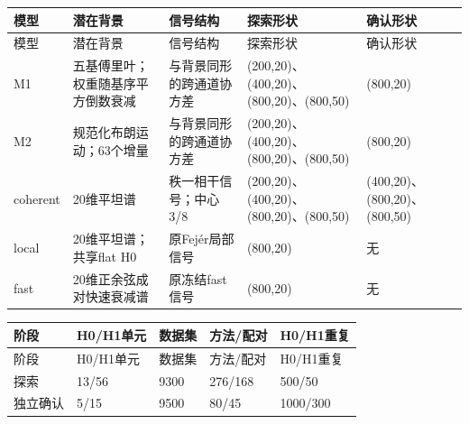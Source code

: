 \begingroup
\fontsize{8.5}{11}\selectfont
\setlength{\tabcolsep}{3pt}
\renewcommand{\arraystretch}{1.15}
\begin{longtable}{p{18mm}p{31mm}p{31mm}p{32mm}p{32mm}}
\toprule
模型 & 潜在背景 & 信号结构 & 探索形状 & 确认形状 \\
\midrule
\endfirsthead
\toprule
模型 & 潜在背景 & 信号结构 & 探索形状 & 确认形状 \\
\midrule
\endhead
M1 & 五基傅里叶；权重随基序平方倒数衰减 & 与背景同形的跨通道协方差 & (200,20)、(400,20)、(800,20)、(800,50) & (800,20) \\
M2 & 规范化布朗运动；63个增量 & 与背景同形的跨通道协方差 & (200,20)、(400,20)、(800,20)、(800,50) & (800,20) \\
coherent & 20维平坦谱 & 秩一相干信号；中心3/8 & (200,20)、(400,20)、(800,20)、(800,50) & (400,20)、(800,20)、(800,50) \\
local & 20维平坦谱；共享flat H0 & 原Fejér局部信号 & (800,20) & 无 \\
fast & 20维正余弦成对快速衰减谱 & 原冻结fast信号 & (800,20) & 无 \\
\bottomrule
\end{longtable}
\endgroup
\begingroup
\fontsize{8.5}{11}\selectfont
\setlength{\tabcolsep}{3pt}
\renewcommand{\arraystretch}{1.15}
\begin{longtable}{p{23mm}p{30mm}p{25mm}p{32mm}p{32mm}}
\toprule
阶段 & H0/H1单元 & 数据集 & 方法/配对 & H0/H1重复 \\
\midrule
\endfirsthead
\toprule
阶段 & H0/H1单元 & 数据集 & 方法/配对 & H0/H1重复 \\
\midrule
\endhead
探索 & 13/56 & 9300 & 276/168 & 500/50 \\
独立确认 & 5/15 & 9500 & 80/45 & 1000/300 \\
\bottomrule
\end{longtable}
\endgroup
{}

